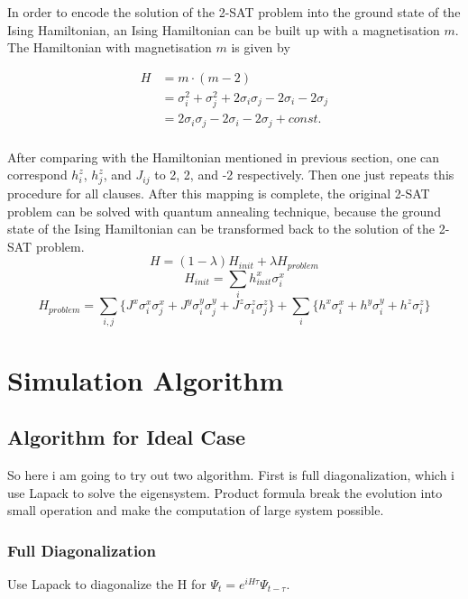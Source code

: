 \documentclass[twoside,a4paper,article]{combine}
\begin{document}
In order to encode the solution of the 2-SAT problem into the ground state of the Ising Hamiltonian, an Ising Hamiltonian can be built up with a magnetisation $m$. The Hamiltonian with magnetisation $m$ is given by 

\begin{equation}
\begin{split}
H & = m \cdot (m-2)\\
  & = \sigma_i^2 + \sigma_j^2 + 2\sigma_i \sigma_j -2\sigma_i -2\sigma_j\\
  & = 2\sigma_i \sigma_j -2\sigma_i -2\sigma_j + const.\\
\end{split}
\end{equation}

After comparing with the Hamiltonian mentioned in previous section, one can correspond $h_i^z$, $h_j^z$, and $J_{ij}$ to 2, 2, and -2 respectively. Then one just repeats this procedure for all clauses. After this mapping is complete, the original 2-SAT problem can be solved with quantum annealing technique, because the ground state of the Ising Hamiltonian can be transformed back to the solution of the 2-SAT problem. \\  




\begin{equation*}
	H=(1-\lambda)H_{init}+\lambda H_{problem}
\end{equation*}
\begin{equation*}
	H_{init}=\sum_{i} h^x_{init} \sigma^x_i
\end{equation*}
\begin{equation*}
	H_{problem}=\sum_{i,j} \{J^x \sigma^x_i \sigma^x_j+J^y \sigma^y_i \sigma^y_j+J^z \sigma^z_i \sigma^z_j \}+ \sum_{i} \{h^x \sigma^x_i+h^y \sigma^y_i+h^z \sigma^z_i\}
\end{equation*}


\section {Simulation Algorithm}
\subsection{Algorithm for Ideal Case}
So here i am going to try out two algorithm. First is full diagonalization, which i use Lapack to solve the eigensystem. Product formula break the evolution into small operation and make the computation of large system possible.
\subsubsection{Full Diagonalization}
Use Lapack to diagonalize the H for $\Psi_{t} = e^{iH\tau} \Psi_{t-\tau}$. 
\end{document}
